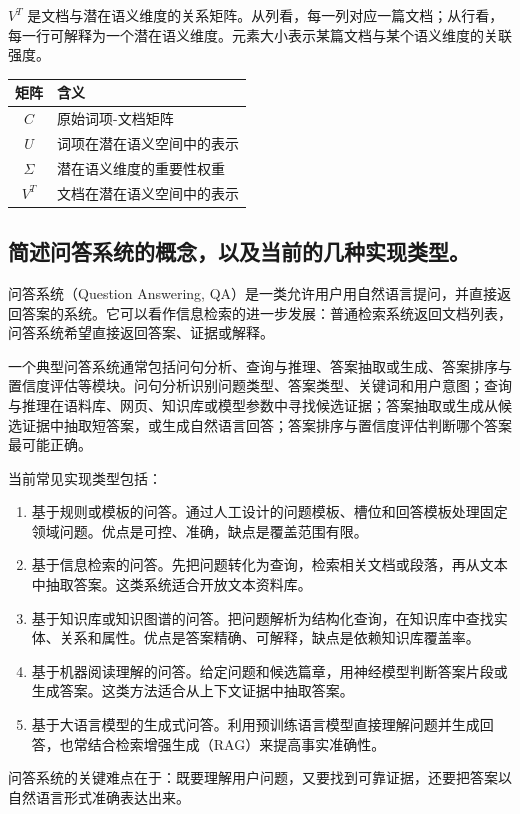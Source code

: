 $V^T$ 是文档与潜在语义维度的关系矩阵。从列看，每一列对应一篇文档；从行看，每一行可解释为一个潜在语义维度。元素大小表示某篇文档与某个语义维度的关联强度。

\begin{table}[H]
\centering
\small
\begin{tabular}{|c|l|}
\hline
矩阵 & 含义 \\ \hline
$C$ & 原始词项-文档矩阵 \\ \hline
$U$ & 词项在潜在语义空间中的表示 \\ \hline
$\Sigma$ & 潜在语义维度的重要性权重 \\ \hline
$V^T$ & 文档在潜在语义空间中的表示 \\ \hline
\end{tabular}
\end{table}

\subsection{简述问答系统的概念，以及当前的几种实现类型。}

问答系统（Question Answering, QA）是一类允许用户用自然语言提问，并直接返回答案的系统。它可以看作信息检索的进一步发展：普通检索系统返回文档列表，问答系统希望直接返回答案、证据或解释。

一个典型问答系统通常包括问句分析、查询与推理、答案抽取或生成、答案排序与置信度评估等模块。问句分析识别问题类型、答案类型、关键词和用户意图；查询与推理在语料库、网页、知识库或模型参数中寻找候选证据；答案抽取或生成从候选证据中抽取短答案，或生成自然语言回答；答案排序与置信度评估判断哪个答案最可能正确。

当前常见实现类型包括：
\begin{enumerate}
  \item 基于规则或模板的问答。通过人工设计的问题模板、槽位和回答模板处理固定领域问题。优点是可控、准确，缺点是覆盖范围有限。
  \item 基于信息检索的问答。先把问题转化为查询，检索相关文档或段落，再从文本中抽取答案。这类系统适合开放文本资料库。
  \item 基于知识库或知识图谱的问答。把问题解析为结构化查询，在知识库中查找实体、关系和属性。优点是答案精确、可解释，缺点是依赖知识库覆盖率。
  \item 基于机器阅读理解的问答。给定问题和候选篇章，用神经模型判断答案片段或生成答案。这类方法适合从上下文证据中抽取答案。
  \item 基于大语言模型的生成式问答。利用预训练语言模型直接理解问题并生成回答，也常结合检索增强生成（RAG）来提高事实准确性。
\end{enumerate}

问答系统的关键难点在于：既要理解用户问题，又要找到可靠证据，还要把答案以自然语言形式准确表达出来。
